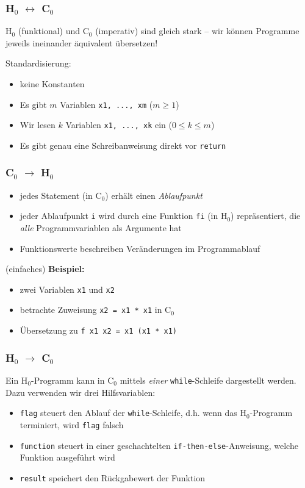 \documentclass{beamer}
\begin{document}
\begin{frame} \frametitle{H${}_\text{0}$ $\leftrightarrow$ C${}_\text{0}$}
	H${}_\text{0}$ (funktional) und C${}_\text{0}$ (imperativ) sind gleich stark -- wir können Programme jeweils ineinander äquivalent übersetzen!
	
	Standardisierung: 
	\begin{itemize}
		\item keine Konstanten
		\item Es gibt $m$ Variablen \texttt{x1, ..., xm} ($m \ge 1$)
		\item Wir lesen $k$ Variablen \texttt{x1, ..., xk} ein ($0 \le k \le m$)
		\item Es gibt genau eine Schreibanweisung direkt vor \texttt{return}
	\end{itemize}
\end{frame}

\begin{frame} \frametitle{C${}_\text{0}$ $\to$ H${}_\text{0}$}
	\begin{itemize}
		\item jedes Statement (in C${}_\text{0}$) erhält einen \textit{Ablaufpunkt}
		\item jeder Ablaufpunkt \texttt{i} wird durch eine Funktion \texttt{fi} (in H${}_\text{0}$) repräsentiert, die \textit{alle} Programmvariablen als Argumente hat
		\item Funktionswerte beschreiben Veränderungen im Programmablauf
	\end{itemize}

	(einfaches) \textbf{Beispiel:} 
	\begin{itemize}
		\item zwei Variablen \texttt{x1} und \texttt{x2}
		\item betrachte Zuweisung \texttt{x2 = x1 * x1} in C${}_\text{0}$
		\item Übersetzung zu \texttt{f x1 x2 = x1 (x1 * x1)}
	\end{itemize}
\end{frame}


\begin{frame} \frametitle{H${}_\text{0}$ $\to$ C${}_\text{0}$}
	Ein H${}_\text{0}$-Programm kann in C${}_\text{0}$ mittels \textit{einer} \texttt{while}-Schleife dargestellt werden. Dazu verwenden wir drei Hilfsvariablen:
	\begin{itemize}
		\item \texttt{flag} steuert den Ablauf der \texttt{while}-Schleife, d.h. wenn das H${}_\text{0}$-Programm terminiert, wird \texttt{flag} falsch
		\item \texttt{function} steuert in einer geschachtelten \texttt{if-then-else}-Anweisung, welche Funktion ausgeführt wird
		\item \texttt{result} speichert den Rückgabewert der Funktion
	\end{itemize}
\end{frame}
\end{document}
